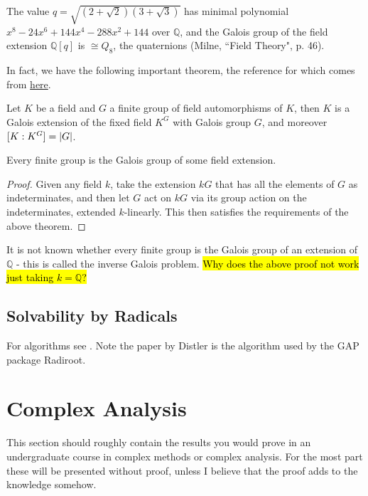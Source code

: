 \documentclass{article}
\begin{document}
\begin{example}
	The value $q = \sqrt{(2+\sqrt{2})(3+\sqrt{3})}$ has minimal polynomial $x^8 - 24x^6 + 144x^4 - 288x^2 + 144$ over $\mathbb{Q}$, and the Galois group of the field extension $\mathbb{Q}[q]$ is $\cong Q_8$, the quaternions (Milne, ``Field Theory", p. 46).
\end{example}

In fact, we have the following important theorem, the reference for which comes from \href{https://alexjbest.github.io/blog/maths/2017/05/02/every-group-is-a-galois-group.html}{here}. 
\begin{theorem}[Artin]
	Let $K$ be a field and $G$ a finite group of field automorphisms of $K$, then $K$ is a Galois extension of the fixed field $K^G$ with Galois group $G$, and moreover $[K : K^G] = \left\lvert G \right\rvert$. 
\end{theorem}
\begin{corollary}
	Every finite group is the Galois group of some field extension. 
\end{corollary}
\begin{proof}
	Given any field $k$, take the extension $kG$ that has all the elements of $G$ as indeterminates, and then let $G$ act on $kG$ via its group action on the indeterminates, extended $k$-linearly. This then satisfies the requirements of the above theorem.  
\end{proof}

\begin{remark}
	It is not known whether every finite group is the Galois group of an extension of $\mathbb{Q}$ - this is called the inverse Galois problem. \hl{Why does the above proof not work just taking $k=\mathbb{Q}$?}
\end{remark}
\subsection{Solvability by Radicals}
For algorithms see \cite{Landau1985, Distler2005}. Note the paper by Distler is the algorithm used by the GAP package Radiroot. 

\section{Complex Analysis}
This section should roughly contain the results you would prove in an undergraduate course in complex methods or complex analysis. For the most part these will be presented without proof, unless I believe that the proof adds to the knowledge somehow. 
\end{document}

